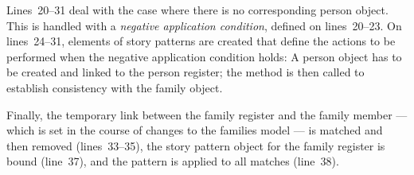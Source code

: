 Lines~20--31 deal with the case where there is no corresponding person object.
This is handled with a \emph{negative application condition}, defined on lines~20--23.
On lines~24--31, elements of story patterns are created that define the actions to be performed when the negative application condition holds: A person object has to be created and linked to the person register; the method  is then called to establish consistency with the family object.

Finally, the temporary link between the family register and the family member --- which is set in the course of changes to the families model --- is matched and then removed (lines~33--35), the story pattern object for the family register is bound (line~37), and the pattern is applied to all matches (line~38).

